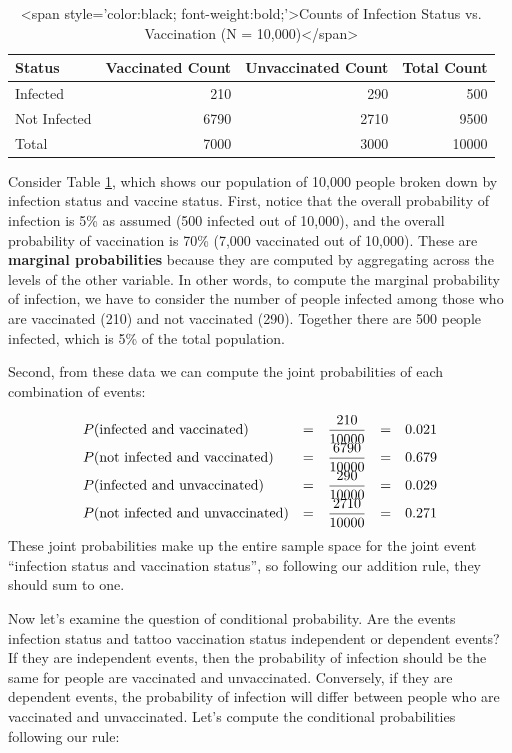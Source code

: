 \documentclass[
]{book}
\begin{document}
\begin{table}
\centering
\caption{\label{tab:c06c01}<span style='color:black; font-weight:bold;'>Counts of Infection Status vs. Vaccination (N = 10,000)</span>}
\centering
\begin{tabular}[t]{l|r|r|r}
\hline
Status & Vaccinated Count & Unvaccinated Count & Total Count\\
\hline
Infected & 210 & 290 & 500\\
\hline
Not Infected & 6790 & 2710 & 9500\\
\hline
Total & 7000 & 3000 & 10000\\
\hline
\end{tabular}
\end{table}

Consider Table \ref{tab:c06c01}, which shows our population of 10,000 people broken down by infection status and vaccine status. First, notice that the overall probability of infection is 5\% as assumed (500 infected out of 10,000), and the overall probability of vaccination is 70\% (7,000 vaccinated out of 10,000). These are \textbf{marginal probabilities} because they are computed by aggregating across the levels of the other variable. In other words, to compute the marginal probability of infection, we have to consider the number of people infected among those who are vaccinated (210) and not vaccinated (290). Together there are 500 people infected, which is 5\% of the total population.

Second, from these data we can compute the joint probabilities of each combination of events:

\[
\begin{array}{l c c c c}
P(\text{infected and vaccinated})       & = & \dfrac{210}{10000}  & = & 0.021 \\
P(\text{not infected and vaccinated})   & = & \dfrac{6790}{10000} & = & 0.679 \\
P(\text{infected and unvaccinated})     & = & \dfrac{290}{10000}  & = & 0.029 \\
P(\text{not infected and unvaccinated}) & = & \dfrac{2710}{10000} & = & 0.271
\end{array}
\]
These joint probabilities make up the entire sample space for the joint event ``infection status and vaccination status'', so following our addition rule, they should sum to one.

Now let's examine the question of conditional probability. Are the events infection status and tattoo vaccination status independent or dependent events? If they are independent events, then the probability of infection should be the same for people are vaccinated and unvaccinated. Conversely, if they are dependent events, the probability of infection will differ between people who are vaccinated and unvaccinated. Let's compute the conditional probabilities following our rule:
\end{document}
